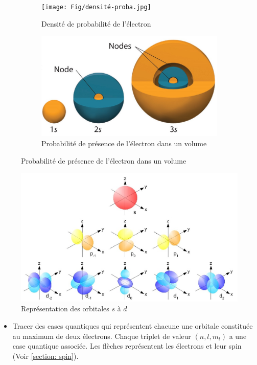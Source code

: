 \documentclass{article}
\begin{document}
\begin{figure}[ht]
    \centering
    \begin{subfigure}{0.45\textwidth}
        \centering
        \texttt{[image: Fig/densité-proba.jpg]}
        \caption{Densité de probabilité de l'électron}
        \label{fig:densité de proba}
    \end{subfigure}
    \hfill\begin{subfigure}{0.45\textwidth}
        \centering
        \includegraphics[width=0.8\linewidth]{Fig/contour-proba.jpg}
        \caption{Probabilité de présence de l'électron dans un volume}
        \label{fig:contour proba}
    \end{subfigure}
\end{figure}

\begin{figure}[h]
    \centering
    \includegraphics[width=0.8\linewidth]{Fig/orbitales.jpg}
    \caption{Représentation des orbitales $s$ à $d$}
    \label{fig:Représentation des orbitales}
\end{figure}

\begin{itemize}[label=$\ast$]
    \item Tracer des cases quantiques qui représentent chacune une orbitale constituée
    au maximum de deux électrons. Chaque triplet de valeur $(n, l, m_l)$ a une case
    quantique associée. Les flèches représentent les électrons et leur spin (Voir \ref{section: spin}).
\end{itemize}
\end{document}
